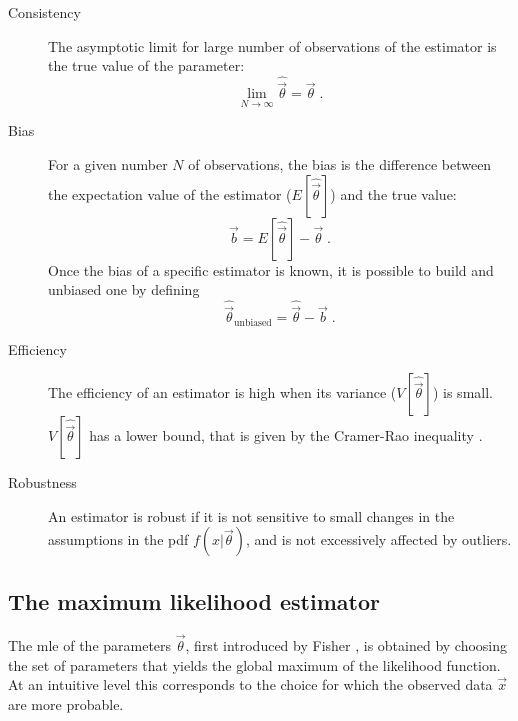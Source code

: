 \begin{description}
\item[Consistency] The asymptotic limit for large number of observations of the estimator is the true value of the parameter:
\begin{equation}
\label{eq:stat:consistency}
\lim_{N \rightarrow \infty} \hat{\vec{\theta}} = \vec{\theta} \; .
\end{equation}

\item[Bias] For a given number $N$ of observations, the bias is the difference between the expectation value of the estimator ($E[\hat{\vec{\theta}}]$) and the true value:
\begin{equation}
\label{eq:stat:bias}
\vec{b} = E[\hat{\vec{\theta}}] - \vec{\theta} \; .
\end{equation}
Once the bias of a specific estimator is known, it is possible to build and unbiased one by defining 
\begin{equation}
\hat{\vec{\theta}}_{\mathrm{unbiased}} = \hat{\vec{\theta}} - \vec{b} \; .
\end{equation}

\item[Efficiency] The efficiency of an estimator is high when its variance ($V[\hat{\vec{\theta}}]$) is small. $V[\hat{\vec{\theta}}]$ has a lower bound, that is given by the Cramer-Rao inequality \cite{Cramer1946,Rao1992}.


\item[Robustness] An estimator is robust if it is not sensitive to small changes in the assumptions in the \gls{pdf} $f(x|\vec{\theta})$, 
and is not 	excessively affected by outliers.
\end{description}



\subsection{The maximum likelihood estimator}
\label{sec:stat:MLE}

The \gls{mle} of the parameters $\vec{\theta}$, first introduced by Fisher \cite{fisher1911absolute,aldrich1997}, is obtained by choosing the set of parameters that yields the global maximum of the likelihood function. At an intuitive level this corresponds to the choice for which the observed data $\vec{x}$ are more probable. 

